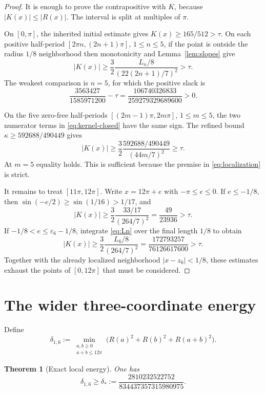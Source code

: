 \documentclass[11pt,reqno]{amsart}
\newtheorem{theorem}{Theorem}[section]
\theoremstyle{definition}
\theoremstyle{remark}
\newcommand{\eps}{\varepsilon}
\begin{document}
\begin{proof}
It is enough to prove the contrapositive with $K$, because
$|K(x)|\le|R(x)|$.  The interval is split at multiples of $\pi$.

On $[0,\pi]$, the inherited initial estimate gives
$K(x)\ge165/512>\tau$.  On each positive half-period
$[2\pi n,(2n+1)\pi]$, $1\le n\le5$, if the point is outside the radius
$1/8$ neighborhood then monotonicity and Lemma~\ref{lem:slopes} give
\begin{equation}\label{eq:positive-half}
 |K(x)|\ge
 \frac32\frac{L_n/8}{(22(2n+1)/7)^2}>\tau.
\end{equation}
The weakest comparison is $n=5$, for which the positive slack is
\[
 \frac{3563427}{1585971200}-\tau
 =\frac{106740326833}{259279329689600}>0.
\]

On the five zero-free half-periods $[(2m-1)\pi,2m\pi]$, $1\le m\le5$,
the two numerator terms in \eqref{eq:kernel-closed} have the same sign.  The
refined bound $\kappa\ge592688/490449$ gives
\begin{equation}\label{eq:zero-free}
 |K(x)|\ge
 \frac32\frac{592688/490449}{(44m/7)^2}\ge\tau.
\end{equation}
At $m=5$ equality holds.  This is sufficient because the premise in
\eqref{eq:localization} is strict.

It remains to treat $[11\pi,12\pi]$.  Write $x=12\pi+e$ with
$-\pi\le e\le0$.  If $e\le-1/8$, then
$\sin(-e/2)\ge\sin(1/16)>1/17$, and
\[
 |K(x)|\ge\frac32\frac{33/17}{(264/7)^2}
 =\frac{49}{23936}>\tau.
\]
If $-1/8<e\le\eps_6-1/8$, integrate \eqref{eq:Ln} over the final length
$1/8$ to obtain
\[
 |K(x)|\ge\frac32\frac{L_6/8}{(264/7)^2}
 =\frac{172793257}{76126617600}>\tau.
\]
Together with the already localized neighborhood $|x-z_6|<1/8$, these
estimates exhaust the points of $[0,12\pi]$ that must be considered.
\end{proof}

\section{The wider three-coordinate energy}

Define
\begin{equation}\label{eq:delta16-def}
 \delta_{1,6}:=
 \min_{\substack{a,b\ge0\\a+b\le12\pi}}
 \bigl(R(a)^2+R(b)^2+R(a+b)^2\bigr).
\end{equation}

\begin{theorem}[Exact local energy]\label{thm:local-energy}
One has
\begin{equation}\label{eq:delta-star}
 \delta_{1,6}\ge\delta_*:=
 \frac{2810232522752}{834437357315980975}.
\end{equation}
\end{theorem}
\end{document}
